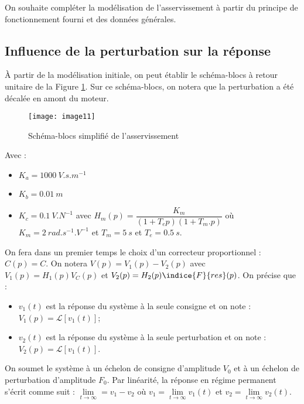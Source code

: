 On souhaite compléter la modélisation de l'asservissement à partir du principe de fonctionnement fourni et des données générales.



\subsection{Influence de la perturbation sur la réponse}
À partir de la modélisation initiale, on peut établir le schéma-blocs à retour unitaire de la Figure \ref{fig:CCMP:2021:11}. Sur ce schéma-blocs, on notera que la perturbation a été décalée en amont du moteur.
 

\begin{figure}[!h]
\centering
\texttt{[image: image11]}
\caption{ \label{fig:CCMP:2021:11} Schéma-blocs simplifié de l'asservissement}
\end{figure}  
 
Avec :
\begin{itemize}
\item $K_a=\SI{1000}{V.s.m^{-1}}$
\item $K_b=\SI{0,01}{m}$
\item $K_c=\SI{0,1}{V.N^{-1}}$ avec $H_m (p)= \dfrac{K_m}{\left(1+T_e p\right) \left(1+T_m.p\right) }$
où $K_m=\SI{2}{rad.s^{-1}.V^{-1}}$ et $T_m=\SI{5}{s}$ et $T_e=\SI{0,5}{s}$.
\end{itemize}	
 

On fera dans un premier temps le choix d'un correcteur proportionnel : $C(p)=C$.
On notera $V(p)=V_1 (p)-V_2 (p)$ avec $V_1 (p)= H_1 (p) V_C (p)$ et $V_2 (p)=H_2 (p) \indice{F}{res}(p)$. On précise que :
\begin{itemize}
    \item $v_1 (t)$ est la réponse du système à la seule consigne et on note : $V_1 (p)=\mathcal{L}\left[v_1 (t)\right] $;
    \item $v_2 (t)$ est la réponse du système à la seule perturbation et on note : $V_2 (p)=\mathcal{L}\left[v_1 (t)\right]$.
\end{itemize}
On soumet le système à un échelon de consigne d'amplitude $V_0$ et à un échelon de perturbation d'amplitude $F_0$. Par linéarité, la réponse en régime permanent s'écrit comme suit :
$\lim\limits_{t\to \infty} = v_1 - v_2$ où $v_1=\lim\limits_{t\to \infty}v_1(t)$ et $v_2=\lim\limits_{t\to \infty}v_2(t)$.

